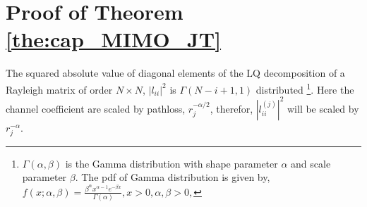 \section{Proof of Theorem \ref{the:cap_MIMO_JT} }\label{proof:theorem-ber-jt-mimo}

The squared absolute value  of diagonal elements of the $\text{LQ}$ decomposition of a Rayleigh matrix of order $N \times N$, $|l_{ii}|^2$ is $\Gamma(N-i+1,1)$ distributed
\footnote{$\Gamma(\alpha,\beta)$ is the Gamma distribution with shape parameter $\alpha$ and scale parameter $\beta$. The pdf of Gamma distribution is given by,
$f(x;\alpha,\beta) = \frac{\beta^\alpha x^{\alpha-1}e^{-\beta x}}{\Gamma(\alpha)}, x>0, \alpha,\beta >0,
$}.
Here the channel coefficient are scaled by pathloss, $r_j^{-\alpha/2}$, therefor, $|l_{ii}^{(j)}|^2$ will be scaled by $r_j^{-\alpha}$. 


